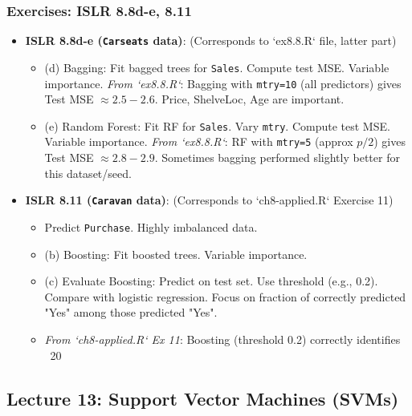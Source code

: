 \documentclass[12pt,a4paper]{article}
\newcommand{\Rpackage}[1]{\texttt{#1}} %
\newcommand{\Rcode}[1]{\texttt{#1}} %
\begin{document}
    \subsubsection{Exercises: ISLR 8.8d-e, 8.11}
        \begin{itemize}
            \item \textbf{ISLR 8.8d-e (\Rpackage{Carseats} data)}: (Corresponds to `ex8.8.R` file, latter part)
                \begin{itemize}
                    \item (d) Bagging: Fit bagged trees for \Rcode{Sales}. Compute test MSE. Variable importance.
                        \textit{From `ex8.8.R`}: Bagging with \Rcode{mtry=10} (all predictors) gives Test MSE $\approx 2.5-2.6$. Price, ShelveLoc, Age are important.
                    \item (e) Random Forest: Fit RF for \Rcode{Sales}. Vary \Rcode{mtry}. Compute test MSE. Variable importance.
                        \textit{From `ex8.8.R`}: RF with \Rcode{mtry=5} (approx $p/2$) gives Test MSE $\approx 2.8-2.9$. Sometimes bagging performed slightly better for this dataset/seed.
                \end{itemize}
            \item \textbf{ISLR 8.11 (\Rpackage{Caravan} data)}: (Corresponds to `ch8-applied.R` Exercise 11)
                \begin{itemize}
                    \item Predict \Rcode{Purchase}. Highly imbalanced data.
                    \item (b) Boosting: Fit boosted trees. Variable importance.
                    \item (c) Evaluate Boosting: Predict on test set. Use threshold (e.g., 0.2). Compare with logistic regression. Focus on fraction of correctly predicted "Yes" among those predicted "Yes".
                    \item \textit{From `ch8-applied.R` Ex 11}: Boosting (threshold 0.2) correctly identifies ~20%
                \end{itemize}
        \end{itemize}

\subsection{Lecture 13: Support Vector Machines (SVMs) }
\end{document}

